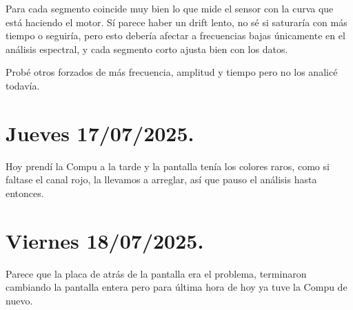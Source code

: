 Para cada segmento coincide muy bien lo que mide el sensor con la curva que está haciendo el motor. Sí parece haber un drift lento, no sé si saturaría con más tiempo o seguiría, pero esto debería afectar a frecuencias bajas únicamente en el análisis espectral, y cada segmento corto ajusta bien con los datos. 

Probé otros forzados de más frecuencia, amplitud y tiempo pero no los analicé todavía. 


\section{Jueves 17/07/2025.}
Hoy prendí la Compu a la tarde y la pantalla tenía los colores raros, como si faltase el canal rojo, la llevamos a arreglar, así que pauso el análisis hasta entonces. 

\section{Viernes 18/07/2025.} 
Parece que la placa de atrás de la pantalla era el problema, terminaron cambiando la pantalla entera pero para última hora de hoy ya tuve la Compu de nuevo. 